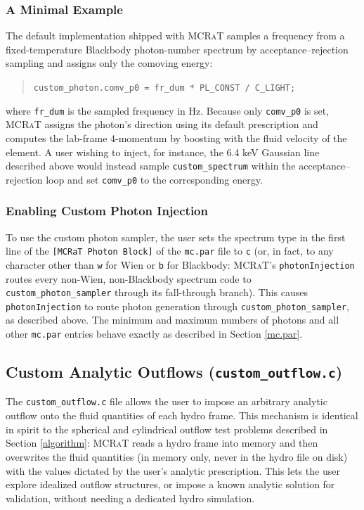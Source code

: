 \documentclass[12pt,a4paper]{article}
\newcommand{\mcrat}{\textsc{MCRaT}}
\begin{document}
\subsubsection{A Minimal Example}
The default implementation shipped with \mcrat{} samples a frequency from a fixed-temperature Blackbody photon-number spectrum by acceptance--rejection sampling and assigns only the comoving energy:
\begin{quotation}
	\texttt{custom\_photon.comv\_p0 = fr\_dum * PL\_CONST / C\_LIGHT;}
\end{quotation}
where \texttt{fr\_dum} is the sampled frequency in Hz. Because only \texttt{comv\_p0} is set, \mcrat{} assigns the photon's direction using its default prescription and computes the lab-frame 4-momentum by boosting with the fluid velocity of the element. A user wishing to inject, for instance, the 6.4 keV Gaussian line described above would instead sample \texttt{custom\_spectrum} within the acceptance--rejection loop and set \texttt{comv\_p0} to the corresponding energy.

\subsubsection{Enabling Custom Photon Injection}
To use the custom photon sampler, the user sets the spectrum type in the first line of the \texttt{[MCRaT Photon Block]} of the \texttt{mc.par} file to \texttt{c} (or, in fact, to any character other than \texttt{w} for Wien or \texttt{b} for Blackbody: \mcrat{}'s \texttt{photonInjection} routes every non-Wien, non-Blackbody spectrum code to \texttt{custom\_photon\_sampler} through its fall-through branch). This causes \texttt{photonInjection} to route photon generation through \texttt{custom\_photon\_sampler}, as described above. The minimum and maximum numbers of photons and all other \texttt{mc.par} entries behave exactly as described in Section \ref{mc.par}.

\subsection{Custom Analytic Outflows (\texttt{custom\_outflow.c})}\label{custom_outflow}
The \texttt{custom\_outflow.c} file allows the user to impose an arbitrary analytic outflow onto the fluid quantities of each hydro frame. This mechanism is identical in spirit to the spherical and cylindrical outflow test problems described in Section \ref{algorithm}: \mcrat{} reads a hydro frame into memory and then overwrites the fluid quantities (in memory only, never in the hydro file on disk) with the values dictated by the user's analytic prescription. This lets the user explore idealized outflow structures, or impose a known analytic solution for validation, without needing a dedicated hydro simulation.
\end{document}
